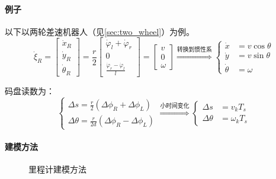 \documentclass[
12pt, %
a4paper, 
oneside, %
headinclude,footinclude, %
]{scrartcl}
\begin{document}
\paragraph{例子}
以下以两轮差速机器人（见\ref{sec:two_wheel}）为例。
$$ 
\dot{\xi}_R = \begin{bmatrix} \dot{x}_R \\ \dot{y}_R \\ \dot{\theta}_R \end{bmatrix} = \frac{r}{2} \begin{bmatrix} \dot{\varphi}_l + \dot{\varphi}_r \\ 0 \\ \frac{\dot{\varphi}_r-\dot{\varphi}_l}{l} \end{bmatrix} = \begin{bmatrix} v \\ 0 \\ \omega \end{bmatrix} 
\overset{\text{转换到惯性系}}{\Longrightarrow}
\begin{cases}
\dot{x} &= v \cos \theta \\
\dot{y} &= v \sin \theta \\
\dot{\theta} &= \omega   
\end{cases}
$$

码盘读数为：
$$ 
\begin{cases}
\Delta s = \frac{r}{2}(\Delta \phi_R + \Delta \phi_L) \\
\Delta \theta = \frac{r}{2d}(\Delta \phi_R - \Delta \phi_L)
\end{cases}
\overset{\text{小时间变化}}{\Longrightarrow}
\begin{cases}
\Delta s &= v_k T_s \\
\Delta \theta &= \omega_k T_s    
\end{cases}   
$$ 
\paragraph{建模方法}
\begin{figure}[H]
\centering
{} \quad
\subfloat[RK2法]{\texttt{[image: rk2]}} \quad
{}
\caption{里程计建模方法}
\end{figure}
\end{document}
